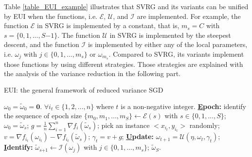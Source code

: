 \documentclass[letterpaper]{article}
\begin{document}
Table \ref{table_EUI_example} illustrates that SVRG and  its variants can be unified by EUI when  the functions, i.e. $\mathcal{E}$, $\mathcal{U}$, and $\mathcal{I}$ are implemented. For example,  the function $\mathcal{E}$ in SVRG is implemented by a constant, that is, $m_s\mathrm{=}C$ with $s\mathrm{=}\{0,1, ..., S\mathrm{-}1\}$. The function $\mathcal{U}$ in SVRG is  implemented by the steepest descent, and the function $\mathcal{I}$ is implemented by either any of the local parameters, i.e. $\omega_j$ with $j\in\{0,1, ..., m_s\}$ or $\omega_{m_s}$.  Compared to  SVRG, its variants implement those functions by using different strategies. Those strategies are explained with the analysis of the variance reduction in the following part. 




\begin{algorithm}[t]
    \caption{EUI: the general framework of  reduced variance SGD}
    \label{algorithm_EUI}
    \begin{algorithmic}[1]
        \Require $\omega_0\mathrm{=}\tilde{\omega}_0\mathrm{=}\mathbf{0}$. $\forall i_t\mathrm{\in}\{1,2, ..., n\}$ where $t$ is a non-negative integer.
        \State \textbf{\uline{E}poch:} identify the sequence of  epoch size $\{m_0, m_1, ..., m_S\}\mathrm{\leftarrow} \mathcal{E}(s)$ with $s\in\{0,1, ..., S\}$;
            \State $\omega_0=\tilde{\omega}_s$;
            \State $g=\frac{1}{n}\sum\limits_{i=1}^n\nabla f_i(\tilde{\omega}_s)$;
                \State pick an instance $\mathrm{<}x_{i_t}, y_{i_t}\mathrm{>}$ randomly;
                \State  $v=\nabla f_{i_t}(\omega_{i_t})-\nabla f_{i_t}(\tilde{\omega}_s)$;
                \State $\gamma_{t}=v+g$;
                \State \textbf{\uline{U}pdate:} $\omega_{t+1}=\mathcal{U}(\eta, \omega_{t}, \gamma_{t})$;
            \EndFor
            \State \textbf{\uline{I}dentify:} $\tilde{\omega}_{s\mathrm{+}1}\mathrm{\leftarrow}\mathcal{I}(\omega_j)$ with $j\mathrm{\in}\{0,1, ..., m_s\}$;
        \EndFor
        \Return $\tilde{\omega}_S$.
    \end{algorithmic}
\end{algorithm}
\end{document}
